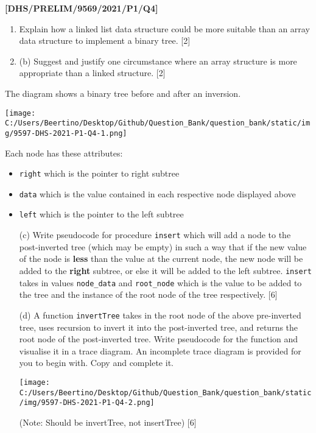 \item \textbf{{[}DHS/PRELIM/9569/2021/P1/Q4{]} }
\begin{enumerate}
\item Explain how a linked list data structure could be more suitable than
an array data structure to implement a binary tree. \hfill{}{[}2{]}
\item (b) Suggest and justify one circumstance where an array structure
is more appropriate than a linked structure. \hfill{}{[}2{]}
\end{enumerate}
The diagram shows a binary tree before and after an inversion. 
\begin{center}
\texttt{[image: C:/Users/Beertino/Desktop/Github/Question\_Bank/question\_bank/static/img/9597-DHS-2021-P1-Q4-1.png]}
\par\end{center}

Each node has these attributes: 
\begin{itemize}
\item \texttt{right} which is the pointer to right subtree 
\item \texttt{data} which is the value contained in each respective node
displayed above 
\item \texttt{left} which is the pointer to the left subtree
\end{itemize}
\begin{enumerate}
\item[(c)]  Write pseudocode for procedure \texttt{insert} which will add a
node to the post-inverted tree (which may be empty) in such a way
that if the new value of the node is \textbf{less} than the value
at the current node, the new node will be added to the \textbf{right}
subtree, or else it will be added to the left subtree. \texttt{insert}
takes in values \texttt{node\_data} and \texttt{root\_node} which
is the value to be added to the tree and the instance of the root
node of the tree respectively. \hfill{}{[}6{]}
\item[(d) ] A function \texttt{invertTree} takes in the root node of the above
pre-inverted tree, uses recursion to invert it into the post-inverted
tree, and returns the root node of the post-inverted tree. Write pseudocode
for the function and visualise it in a trace diagram. An incomplete
trace diagram is provided for you to begin with. Copy and complete
it. 
\noindent \begin{center}
\texttt{[image: C:/Users/Beertino/Desktop/Github/Question\_Bank/question\_bank/static/img/9597-DHS-2021-P1-Q4-2.png]}
\par\end{center}

(Note: Should be invertTree, not insertTree) \hfill{}{[}6{]}
\end{enumerate}